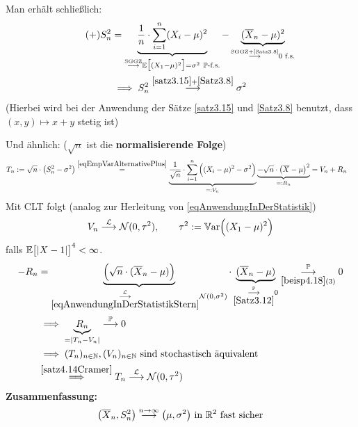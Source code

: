 Man erhält schließlich:
\begin{align}\label{eqEmpVarAlternativePlus}\tag{+}
S_n^2&=\underbrace{\frac{1}{n}\cdot\sum\limits_{i=1}^n(X_i-\mu)^2}_{\stackrel{\text{SGGZ}}{\longrightarrow}\mathbb{E}\big[(X_1-\mu)^2\big]=\sigma^2~\mathbb{P}\text{-f.s.}}-\underbrace{(\overline{X}_n-\mu)^2}_{\stackrel{\text{SGGZ+\ref{Satz3.8}}}{\longrightarrow}0\text{ f.s.}}\\\nonumber
&\implies
S_n^2\stackrel{\ref{satz3.15}+\ref{Satz3.8}}{\longrightarrow}\sigma^2
\end{align}
(Hierbei wird bei der Anwendung der Sätze \ref{satz3.15} und \ref{Satz3.8} benutzt, dass $(x,y)\mapsto x+y$ stetig ist)

Und ähnlich: ($\sqrt{n}$ ist die \textbf{normalisierende Folge})
\begin{align*}
T_n&:=\sqrt{n}\cdot\left(S_n^2-\sigma^2\right)
\stackrel{\eqref{eqEmpVarAlternativePlus}}{=}
\underbrace{\frac{1}{\sqrt{n}}\cdot\sum\limits_{i=1}^n\Big((X_i-\mu)^2-\sigma^2\Big)}_{=:V_n}\underbrace{-\sqrt{n}\cdot\big(\overline{X}-\mu\big)^2}_{=:R_n}
=V_n+R_n
\end{align*}
Mit CLT folgt (analog zur Herleitung von \eqref{eqAnwendungInDerStatistik})
\begin{align*}
V_n\stackrel{\mathcal{L}}{\longrightarrow}\mathcal{N}(0,\tau^2),\qquad\tau^2:=\mathbb{V}\text{ar}\Big((X_1-\mu)^2\Big)
\end{align*}
falls $\mathbb{E}\big[|X-1|\big]^4<\infty$.
\begin{align*}
-R_n&=\underbrace{\Big(\sqrt{n}\cdot(\overline{X}_n-\mu)\Big)}_{\underset{\eqref{eqAnwendungInDerStatistikStern}}{\overset{\mathcal{L}}{\longrightarrow}}\mathcal{N}(0,\sigma^2)}\cdot\underbrace{(\overline{X}_n-\mu)}_{\underset{\ref{Satz3.12}}{\overset{\mathbb{P}}{\longrightarrow}}0}\underset{\ref{beisp4.18}(3)}{\overset{\mathbb{P}}{\longrightarrow}}0\\
&\implies \underbrace{R_n}_{=|T_n-V_n|}\stackrel{\mathbb{P}}{\longrightarrow}0\\
&\implies(T_n)_{n\in\mathbb{N}},(V_n)_{n\in\mathbb{N}}\text{ sind stochastisch äquivalent}\\
&\stackrel{\ref{satz4.14Cramer}}{\implies}
T_n\stackrel{\mathcal{L}}{\longrightarrow}\mathcal{N}(0,\tau^2)
\end{align*}
\textbf{Zusammenfassung:}
\begin{align*}
\big(\overline{X}_n,S_n^2\big)\stackrel{n\to\infty}{\longrightarrow}\big(\mu,\sigma^2\big)\text{ in }\mathbb{R}^2\text{ fast sicher}
\end{align*}
